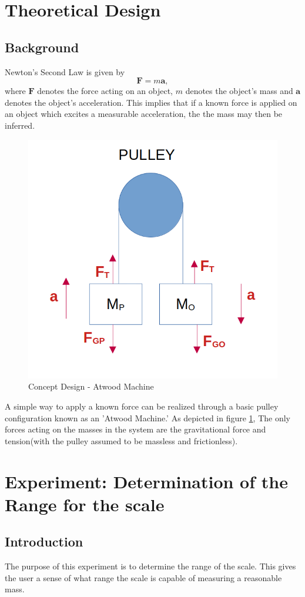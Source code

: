 \documentclass[11pt,peerreview]{IEEEtran}
\begin{document}
\section{Theoretical Design}
\subsection{Background}
Newton's Second Law is given by
\begin{equation}\label{eq:Newton2}
    \mathbf{F} = m\mathbf{a},
\end{equation} where $\mathbf{F}$ denotes the force acting on an object, $m$ denotes the object's mass and $\mathbf{a}$ denotes the object's acceleration\cite{halliday2016principles}. This implies that if a known force is applied on an object which excites a measurable acceleration, the the mass may then be inferred.

\begin{figure}[H]
\centering
\includegraphics[scale=0.45]{atwood.png}
\caption{Concept Design - Atwood Machine}
\label{fig:atwood}
\end{figure}
A simple way to apply a known force can be realized through a basic pulley configuration known as an 'Atwood Machine.'\cite{monteiro2015atwood} As depicted in figure \ref{fig:atwood}, The only forces acting on the masses in the system are the gravitational force and tension(with the pulley assumed to be massless and frictionless).


\pagebreak


\pagebreak

\appendices
\section{Experiment: Determination of the Range for the scale}\label{AppRange}
\subsection{Introduction}
The purpose of this experiment is to determine the range of the scale. This gives the user a sense of what range the scale is capable of measuring a reasonable mass.  
\end{document}
